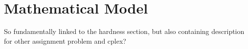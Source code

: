\section{Mathematical Model}
So fundamentally linked to the hardness section, but also containing description for other assignment problem and cplex?
